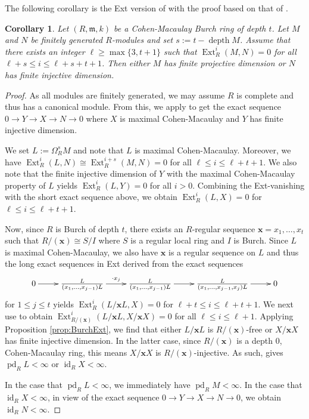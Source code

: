 \documentclass{amsart}
\newcommand{\depth}[1]{\operatorname{depth} {#1}}
\newcommand{\m}{\mathfrak{m}}
\DeclareMathOperator{\Ext}{Ext}
\DeclareMathOperator{\pd}{pd}
\DeclareMathOperator{\id}{id}
\theoremstyle{plain}
\newtheorem{cor}[theorem]{Corollary}
\theoremstyle{definition}
\numberwithin{theorem}{section}
\numberwithin{equation}{section}
\numberwithin{equation}{theorem}
\begin{document}
The following corollary is the Ext version of \cite[Corollary 7.13]{DKT} with the proof based on that of \cite[Corollary 6.6]{NT}.

\begin{cor}\label{cor:BurchExt}
Let $(R,\m,k)$ be a Cohen-Macaulay Burch ring of depth $t$. Let $M$ and $N$ be finitely generated $R$-modules and set $s := t - \depth M$. Assume that there exists an integer $\ell \geq \max\{3,t + 1\}$ such that $\Ext_R^i(M,N) = 0$ for all $\ell + s \leq i \leq \ell + s + t + 1$. Then either $M$ has finite projective dimension or $N$ has finite injective dimension.
\end{cor}

\begin{proof}
As all modules are finitely generated, we may assume $R$ is complete and thus has a canonical module. From this, we apply \cite[Theorem 1.1]{AB} to get the exact sequence $0 \to Y \to X \to N \to 0$ where $X$ is maximal Cohen-Macaulay and $Y$ has finite injective dimension.

We set $L := \Omega_R^s M$ and note that $L$ is maximal Cohen-Macaulay. Moreover, we have $\Ext_R^i(L,N) \cong \Ext_R^{i + s}(M,N) = 0$ for all $\ell \leq i \leq \ell + t + 1$. We also note that the finite injective dimension of $Y$ with the maximal Cohen-Macaulay property of $L$ yields $\Ext_R^i(L,Y)=0$ for all $i > 0$. Combining the Ext-vanishing with the short exact sequence above, we obtain $\Ext_R^i(L,X) = 0$ for $\ell \leq i \leq \ell + t + 1$.

Now, since $R$ is Burch of depth $t$, there exists an $R$-regular sequence $\mathbf{x} = x_1, \ldots, x_t$ such that $R / ( \mathbf{x} ) \cong S/I$ where $S$ is a regular local ring and $I$ is Burch. Since $L$ is maximal Cohen-Macaulay, we also have $\mathbf{x}$ is a regular sequence on $L$ and thus the long exact sequences in Ext derived from the exact sequences
\[\xymatrix{
0 \ar[r] & \frac{L}{(x_1,\ldots,x_{j-1})L} \ar[r]^-{\cdot x_j} & \frac{L}{(x_1,\ldots,x_{j-1})L} \ar[r] & \frac{L}{(x_1,\ldots,x_{j-1},x_j)L} \ar[r] & 0
}\]
for $1 \leq j \leq t$ yields $\Ext_R^i(L/\mathbf{x}L,X)=0$ for $\ell + t \leq i \leq \ell + t + 1$. We next use \cite[section 18, lemma 2(i)]{M} to obtain $\Ext_{R/(\mathbf{x})}^i(L/\mathbf{x}L,X/\mathbf{x}X) = 0$ for all $\ell \leq i \leq \ell + 1$. Applying Proposition \ref{prop:BurchExt}, we find that either $L/\mathbf{x}L$ is $R/(\mathbf{x})$-free or $X/\mathbf{x}X$ has finite injective dimension. In the latter case, since $R/(\mathbf{x})$ is a depth 0, Cohen-Macaulay ring, this means $X/\mathbf{x}X$ is $R/(\mathbf{x})$-injective. As such, \cite[lemma 1.3.5 and corollary 3.1.15]{BH} gives $\pd_R L < \infty$ or $\id_R X < \infty$.

In the case that $\pd_R L < \infty$, we immediately have $\pd_R M < \infty$. 
In the case that $\id_R X < \infty$, in view of the exact sequence $0 \to Y \to X \to N \to 0$, we obtain $\id_R N < \infty$.


\end{proof}
\end{document}
